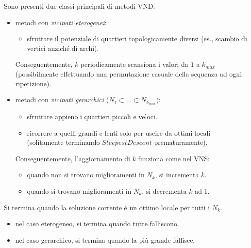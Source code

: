 \documentclass{article}
\begin{document}
Sono presenti due classi principali di metodi VND:
\begin{itemize}
    \item metodi con \textit{vicinati eterogenei}:
    \begin{itemize}
        \item sfruttare il potenziale di quartieri topologicamente diversi (es.,
        scambio di vertici anziché di archi).
    \end{itemize}
    Conseguentemente, $k$ periodicamente scansiona i valori da $1$ a $k_{max}$ (possibilmente
    effettuando una permutazione casuale della sequenza ad ogni ripetizione).
    \item metodi con \textit{vicinati gerarchici} ($N_1\subset\dots\subset N_{k_{max}}$):
    \begin{itemize}
        \item sfruttare appieno i quartieri piccoli e veloci.
        \item ricorrere a quelli grandi e lenti solo per uscire da ottimi locali
        (solitamente terminando $SteepestDescent$ prematuramente).
    \end{itemize}
    Conseguentemente, l'aggiornamento di $k$ funziona come nel VNS:
    \begin{itemize}
        \item quando non si trovano miglioramenti in $N_k$, si incrementa $k$.
        \item quando si trovano miglioramenti in $N_k$, si decrementa $k$ ad 1.
    \end{itemize}
\end{itemize}
Si termina quando la soluzione corrente è un ottimo locale per tutti i $N_k$.
\begin{itemize}
    \item nel caso eterogeneo, si termina quando tutte falliscono.
    \item nel caso gerarchico, si termina quando la più grande fallisce.
\end{itemize}
\end{document}

